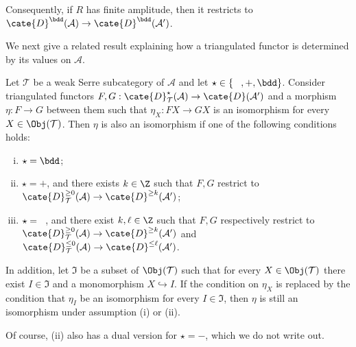 Consequently, if $R$ has finite amplitude, then it restricts to
$\cate{D}^{\bdd}(\mathcal{A})\to\cate{D}^{\bdd}(\mathcal{A}')$.

We next give a related result explaining how a triangulated functor is
determined by its values on $\mathcal{A}$.

\begin{proposition}\label{prop:wayout}
	Let $\mathcal{T}$ be a weak Serre subcategory of $\mathcal{A}$ and let
	$\star\in\{\hspace{0.8em},+,\bdd\}$. Consider triangulated functors
	$F,G:\cate{D}^{\star}_{\mathcal{T}}(\mathcal{A})\to
	\cate{D}(\mathcal{A}')$ and a morphism $\eta:F\to G$ between them such
	that $\eta_X:FX\to GX$ is an isomorphism for every
	$X\in\Obj(\mathcal{T})$. Then $\eta$ is also an isomorphism if one of the
	following conditions holds:
	\begin{enumerate}[(i)]
		\item $\star=\bdd$;
		\item $\star=+$, and there exists $k\in\Z$ such that $F,G$ restrict
		to $\cate{D}^{\geq0}_{\mathcal{T}}(\mathcal{A})\to
		\cate{D}^{\geq k}(\mathcal{A}')$;
		\item $\star=\hspace{0.8em}$, and there exist $k,\ell\in\Z$ such that
		$F,G$ respectively restrict to
		$\cate{D}^{\geq0}_{\mathcal{T}}(\mathcal{A})\to
		\cate{D}^{\geq k}(\mathcal{A}')$ and
		$\cate{D}^{\leq0}_{\mathcal{T}}(\mathcal{A})\to
		\cate{D}^{\leq\ell}(\mathcal{A}')$.
	\end{enumerate}

	In addition, let $\mathfrak{I}$ be a subset of $\Obj(\mathcal{T})$ such
	that for every $X\in\Obj(\mathcal{T})$ there exist
	$I\in\mathfrak{I}$ and a monomorphism $X\hookrightarrow I$. If the
	condition on $\eta_X$ is replaced by the condition that $\eta_I$ be an
	isomorphism for every $I\in\mathfrak{I}$, then $\eta$ is still an
	isomorphism under assumption (i) or (ii).

	Of course, (ii) also has a dual version for $\star=-$, which we do not
	write out.
\end{proposition}

